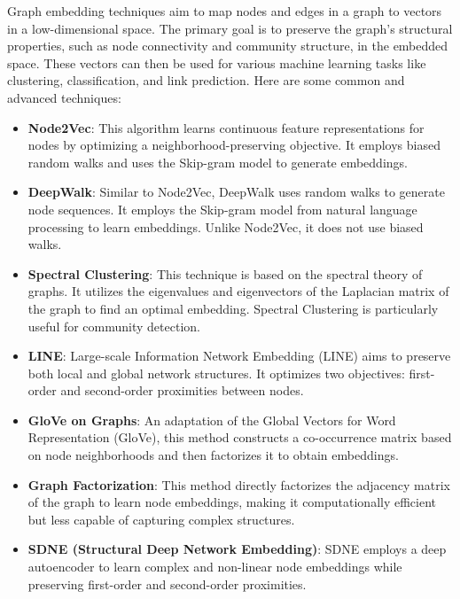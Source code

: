     Graph embedding techniques aim to map nodes and edges in a graph to vectors in a low-dimensional space. The primary goal is to preserve the graph's structural properties, such as node connectivity and community structure, in the embedded space. These vectors can then be used for various machine learning tasks like clustering, classification, and link prediction. Here are some common and advanced techniques:
    
    \begin{itemize}
        \item \textbf{Node2Vec}: This algorithm learns continuous feature representations for nodes by optimizing a neighborhood-preserving objective. It employs biased random walks and uses the Skip-gram model to generate embeddings.
        
        \item \textbf{DeepWalk}: Similar to Node2Vec, DeepWalk uses random walks to generate node sequences. It employs the Skip-gram model from natural language processing to learn embeddings. Unlike Node2Vec, it does not use biased walks.
        
        \item \textbf{Spectral Clustering}: This technique is based on the spectral theory of graphs. It utilizes the eigenvalues and eigenvectors of the Laplacian matrix of the graph to find an optimal embedding. Spectral Clustering is particularly useful for community detection.
        
        \item \textbf{LINE}: Large-scale Information Network Embedding (LINE) aims to preserve both local and global network structures. It optimizes two objectives: first-order and second-order proximities between nodes.
        
        \item \textbf{GloVe on Graphs}: An adaptation of the Global Vectors for Word Representation (GloVe), this method constructs a co-occurrence matrix based on node neighborhoods and then factorizes it to obtain embeddings.
        
        \item \textbf{Graph Factorization}: This method directly factorizes the adjacency matrix of the graph to learn node embeddings, making it computationally efficient but less capable of capturing complex structures.
        
        \item \textbf{SDNE (Structural Deep Network Embedding)}: SDNE employs a deep autoencoder to learn complex and non-linear node embeddings while preserving first-order and second-order proximities.
    \end{itemize}

